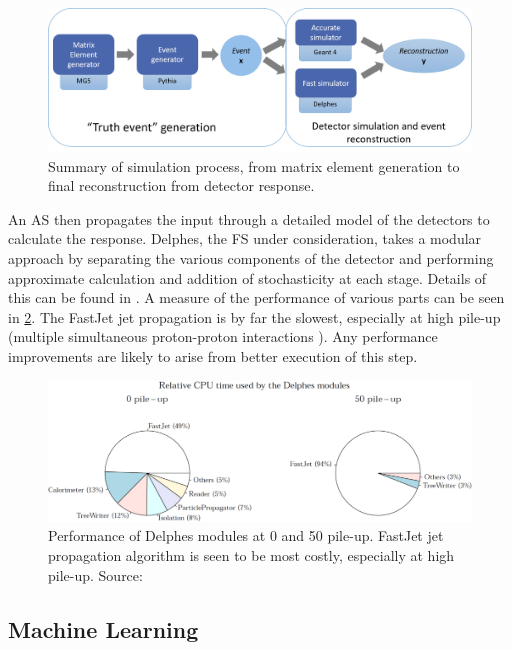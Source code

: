 \documentclass{article}
\begin{document}
\begin{figure}[H]
	\centering
	\includegraphics[width=0.8\linewidth]{img/simdiag}
	
	\caption{Summary of simulation process, from matrix element generation to final reconstruction from detector response.}
	\label{fig:simdiag}
	
\end{figure}	


An AS then propagates the input through a detailed model of the detectors to calculate the response. Delphes, the FS under consideration, takes a modular approach by separating the various components of the detector and performing approximate calculation and addition of stochasticity at each stage. Details of this can be found in \cite{delphes}. A measure of the performance of various parts can be seen in \cref{fig:delphescpu}. The FastJet jet propagation \cite{fastjet} is by far the slowest, especially at high pile-up (multiple simultaneous proton-proton interactions \cite{marshall}). Any performance improvements are likely to arise from better execution of this step. \\ 


\begin{figure}[H]
	\centering
	\includegraphics[width=0.7\linewidth]{img/delphescpu}
	
	\caption{Performance of Delphes modules at 0 and 50 pile-up. FastJet jet propagation algorithm is seen to be most costly, especially at high pile-up. Source: \cite{delphes}}
	\label{fig:delphescpu}
	
\end{figure}

 
\subsection{Machine Learning}
\label{sec:ml}
\end{document}
